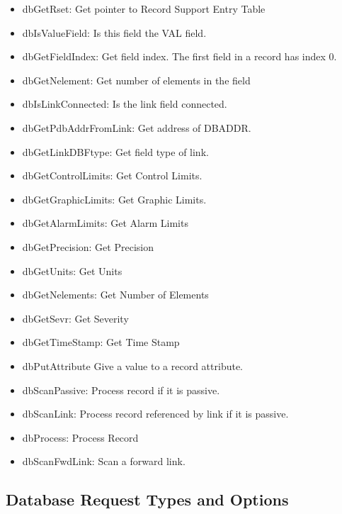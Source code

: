 \begin{itemize}
\item dbGetRset: Get pointer to Record Support Entry Table

\item dbIsValueField: Is this field the VAL field.

\item dbGetFieldIndex: Get field index. The first field in a record has index 0.

\item dbGetNelement: Get number of elements in the field

\item dbIsLinkConnected: Is the link field connected.

\item dbGetPdbAddrFromLink: Get address of DBADDR.

\item dbGetLinkDBFtype: Get field type of link.

\item dbGetControlLimits: Get Control Limits.

\item dbGetGraphicLimits: Get Graphic Limits.

\item dbGetAlarmLimits: Get Alarm Limits

\item dbGetPrecision: Get Precision

\item dbGetUnits: Get Units

\item dbGetNelements: Get Number of Elements

\item dbGetSevr: Get Severity

\item dbGetTimeStamp: Get Time Stamp



\item dbPutAttribute Give a value to a record attribute.



\item dbScanPassive: Process record if it is passive.

\item dbScanLink: Process record referenced by link if it is passive.

\item dbProcess: Process Record

\item dbScanFwdLink: Scan a forward link.

\end{itemize}\subsection{Database Request Types and Options}

